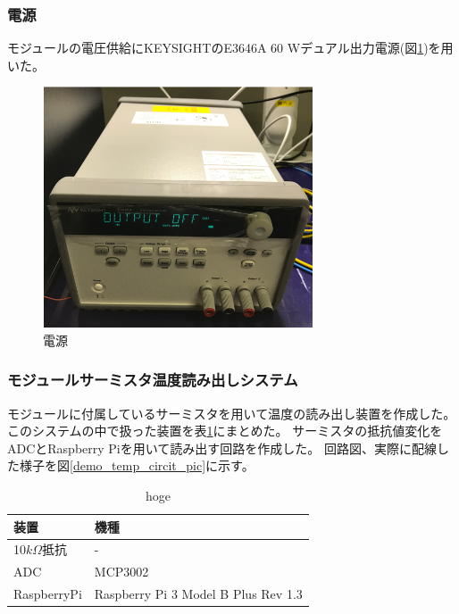 \subsubsection{電源}
モジュールの電圧供給にKEYSIGHTのE3646A 60 Wデュアル出力電源\cite{1}(図\ref{demo_power_supply})を用いた。
\begin{figure}[h]\centering
\includegraphics[width=8cm]{power_supply}
\caption[電源]{電源}
\label{demo_power_supply}
\end{figure}

\subsubsection{モジュールサーミスタ温度読み出しシステム}
モジュールに付属しているサーミスタを用いて温度の読み出し装置を作成した。
このシステムの中で扱った装置を表\ref{demo_temp_device}にまとめた。
サーミスタの抵抗値変化をADCとRaspberry Piを用いて読み出す回路を作成した。
回路図、実際に配線した様子を図\ref{demo_temp_circit_pic}に示す。

\begin{table}[tbp]
\begin{center}
\caption[hoge]{hoge}
\label{demo_temp_device}
  \begin{tabular}{|ll|} \hline
    装置 & 機種 \\ \hline
    10$k\Omega$抵抗 & - \\
    ADC & MCP3002\cite{3} \\  
    RaspberryPi &  Raspberry Pi 3 Model B Plus Rev 1.3\cite{3} \\ \hline 
  \end{tabular}
\end{center}
\end{table}

